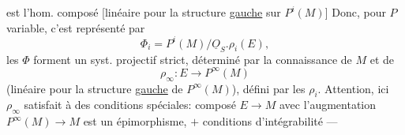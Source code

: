 est l'hom. composé [linéaire pour la structure \uline{gauche} sur $P^i(M)$]
Donc, pour $P$ variable, c'est représenté par
\[
\Phi_i=P^i(M)/\underline{O}_S.\rho_i(E),
\]
les $\Phi$ forment un syst. projectif strict, déterminé par la connaissance de $M$ et de
\[
\rho_\infty:E\longrightarrow P^\infty(M)
\]
(linéaire pour la structure \uline{gauche} de $P^\infty(M)$), défini par les $\rho_i$.
Attention, ici $\rho_\infty$ satisfait à des  conditions spéciales:  composé $E\to M$ avec l'augmentation $P^\infty(M)\to M$ est un épimorphisme, $+$ conditions d'intégrabilité ---
